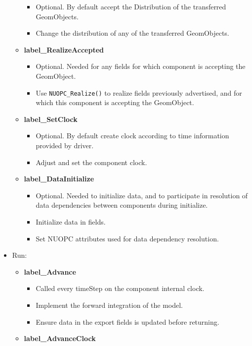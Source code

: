 \begin{itemize}
\begin{itemize}
\begin{itemize}
      \item Optional. By default accept the Distribution of the transferred GeomObjects.
      \item Change the distribution of any of the transferred GeomObjects.
    \end{itemize}
    \item {\bf label\_RealizeAccepted}
    \begin{itemize}
      \item Optional. Needed for any fields for which component is accepting the GeomObject.
      \item Use {\tt NUOPC\_Realize()} to realize fields previously advertised, and for which this component is accepting the GeomObject.
    \end{itemize}
    \item {\bf label\_SetClock}
    \begin{itemize}
      \item Optional. By default create clock according to time information provided by driver.
      \item Adjust and set the component clock.
    \end{itemize}
    \item {\bf label\_DataInitialize}
    \begin{itemize}
      \item Optional. Needed to initialize data, and to participate in resolution of data dependencies between components during initialize.
      \item Initialize data in fields.
      \item Set NUOPC attributes used for data dependency resolution.
    \end{itemize}
  \end{itemize}
  \item Run:
  \begin{itemize}
    \item {\bf label\_Advance}
    \begin{itemize}
      \item Called every timeStep on the component internal clock.
      \item Implement the forward integration of the model.
      \item Ensure data in the export fields is updated before returning.
    \end{itemize}
    \item {\bf label\_AdvanceClock}
    \begin{itemize}

\end{itemize}
\end{itemize}
\end{itemize}
